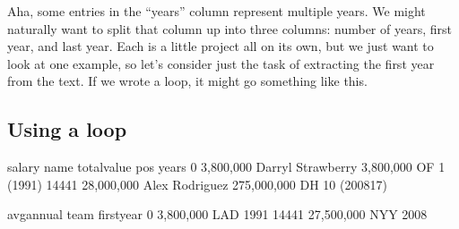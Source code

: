 \documentclass[letterpaper,10pt,english]{sphinxmanual}
\begin{document}
Aha, some entries in the “years” column represent multiple years.  We might naturally want to split that column up into three columns: number of years, first year, and last year.  Each is a little project all on its own, but we just want to look at one example, so let’s consider just the task of extracting the first year from the text.  If we wrote a loop, it might go something like this.


\subsection{Using a loop}
\label{\detokenize{chapter-11-processing-rows:using-a-loop}}
\begin{sphinxVerbatim}[commandchars=\\\{\}]
  \PYG{p}{[} \PYG{p}{]}
   \PYG{p}{[}\PYG{p}{]}
     \PYG{p}{[}\PYG{p}{]}   
          \PYG{p}{[}\PYG{p}{]}  
     
          \PYG{p}{[}\PYG{p}{]}  
\PYG{p}{[}\PYG{p}{]}  
        
\PYG{p}{[}\PYG{p}{[}\PYG{p}{]}\PYG{p}{]} 
\end{sphinxVerbatim}

\begin{sphinxVerbatim}[commandchars=\\\{\}]
             salary               name    total\PYGZus{}value pos         years  \PYGZbs{}
0       \PYGZdl{} 3,800,000  Darryl Strawberry    \PYGZdl{} 3,800,000  OF      1 (1991)   
14441  \PYGZdl{} 28,000,000     Alex Rodriguez  \PYGZdl{} 275,000,000  DH  10 (2008\PYGZhy{}17)   

         avg\PYGZus{}annual team  first\PYGZus{}year  
0       \PYGZdl{} 3,800,000  LAD        1991  
14441  \PYGZdl{} 27,500,000  NYY        2008  
\end{sphinxVerbatim}
\end{document}
